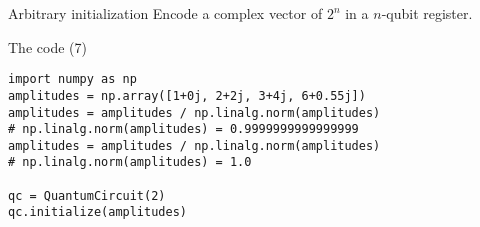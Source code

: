 \begin{frame}{Arbitrary initialization}
Encode a complex vector of \(2^n\) in a \(n\)-qubit register.
\end{frame}

\begin{frame}[fragile]{The code (7)}
\begin{verbatim}
import numpy as np
amplitudes = np.array([1+0j, 2+2j, 3+4j, 6+0.55j])
amplitudes = amplitudes / np.linalg.norm(amplitudes)
# np.linalg.norm(amplitudes) = 0.9999999999999999
amplitudes = amplitudes / np.linalg.norm(amplitudes)
# np.linalg.norm(amplitudes) = 1.0

qc = QuantumCircuit(2)
qc.initialize(amplitudes)
\end{verbatim}
\end{frame}